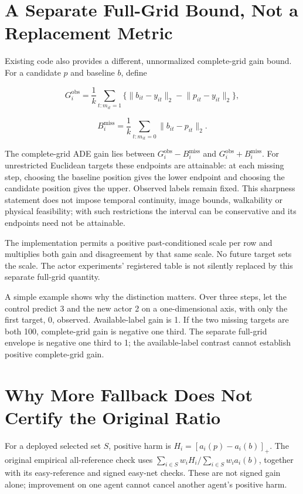 \documentclass[10pt,twocolumn,letterpaper]{article}
\begin{document}
\section{A Separate Full-Grid Bound, Not a Replacement Metric}

Existing code also provides a different, unnormalized complete-grid gain bound. For a candidate $p$ and baseline $b$, define


\[
G_i^{\mathrm{obs}}=\frac{1}{k}\sum_{t:m_{it}=1}
\{\lVert b_{it}-y_{it}\rVert_2-\lVert p_{it}-y_{it}\rVert_2\},
\]

\[
B_i^{\mathrm{miss}}=\frac{1}{k}\sum_{t:m_{it}=0}
\lVert b_{it}-p_{it}\rVert_2.
\]

The complete-grid ADE gain lies between $G_i^{\mathrm{obs}}-B_i^{\mathrm{miss}}$ and $G_i^{\mathrm{obs}}+B_i^{\mathrm{miss}}$. For unrestricted Euclidean targets these endpoints are attainable: at each missing step, choosing the baseline position gives the lower endpoint and choosing the candidate position gives the upper. Observed labels remain fixed. This sharpness statement does not impose temporal continuity, image bounds, walkability or physical feasibility; with such restrictions the interval can be conservative and its endpoints need not be attainable.


The implementation permits a positive past-conditioned scale per row and multiplies both gain and disagreement by that same scale. No future target sets the scale. The actor experiments' registered table is not silently replaced by this separate full-grid quantity.


A simple example shows why the distinction matters. Over three steps, let the control predict 3 and the new actor 2 on a one-dimensional axis, with only the first target, 0, observed. Available-label gain is 1. If the two missing targets are both 100, complete-grid gain is negative one third. The separate full-grid envelope is negative one third to 1; the available-label contrast cannot establish positive complete-grid gain.


\section{Why More Fallback Does Not Certify the Original Ratio}

For a deployed selected set $S$, positive harm is $H_i=[a_i(p)-a_i(b)]_+$. The original empirical all-reference check uses $\sum_{i\in S}w_iH_i/\sum_{i\in S}w_i a_i(b)$, together with its easy-reference and signed easy-net checks. These are not signed gain alone; improvement on one agent cannot cancel another agent's positive harm.
\end{document}
